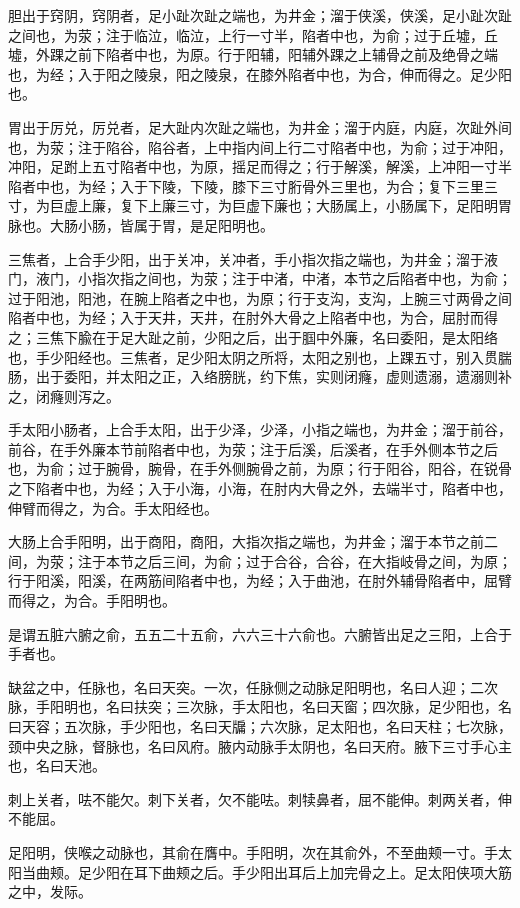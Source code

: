 \documentclass[a4paper,12pt,UTF8,twoside]{ctexbook}
\begin{document}
	胆出于窍阴，窍阴者，足小趾次趾之端也，为井金；溜于侠溪，侠溪，足小趾次趾之间也，为荥；注于临泣，临泣，上行一寸半，陷者中也，为俞；过于丘墟，丘墟，外踝之前下陷者中也，为原。行于阳辅，阳辅外踝之上辅骨之前及绝骨之端也，为经；入于阳之陵泉，阳之陵泉，在膝外陷者中也，为合，伸而得之。足少阳也。
	
	胃出于厉兑，厉兑者，足大趾内次趾之端也，为井金；溜于内庭，内庭，次趾外间也，为荥；注于陷谷，陷谷者，上中指内间上行二寸陷者中也，为俞；过于冲阳，冲阳，足跗上五寸陷者中也，为原，摇足而得之；行于解溪，解溪，上冲阳一寸半陷者中也，为经；入于下陵，下陵，膝下三寸胻骨外三里也，为合；复下三里三寸，为巨虚上廉，复下上廉三寸，为巨虚下廉也；大肠属上，小肠属下，足阳明胃脉也。大肠小肠，皆属于胃，是足阳明也。
	
	三焦者，上合手少阳，出于关冲，关冲者，手小指次指之端也，为井金；溜于液门，液门，小指次指之间也，为荥；注于中渚，中渚，本节之后陷者中也，为俞；过于阳池，阳池，在腕上陷者之中也，为原；行于支沟，支沟，上腕三寸两骨之间陷者中也，为经；入于天井，天井，在肘外大骨之上陷者中也，为合，屈肘而得之；三焦下腧在于足大趾之前，少阳之后，出于腘中外廉，名曰委阳，是太阳络也，手少阳经也。三焦者，足少阳太阴之所将，太阳之别也，上踝五寸，别入贯腨肠，出于委阳，并太阳之正，入络膀胱，约下焦，实则闭癃，虚则遗溺，遗溺则补之，闭癃则泻之。
	
	手太阳小肠者，上合手太阳，出于少泽，少泽，小指之端也，为井金；溜于前谷，前谷，在手外廉本节前陷者中也，为荥；注于后溪，后溪者，在手外侧本节之后也，为俞；过于腕骨，腕骨，在手外侧腕骨之前，为原；行于阳谷，阳谷，在锐骨之下陷者中也，为经；入于小海，小海，在肘内大骨之外，去端半寸，陷者中也，伸臂而得之，为合。手太阳经也。
	
	大肠上合手阳明，出于商阳，商阳，大指次指之端也，为井金；溜于本节之前二间，为荥；注于本节之后三间，为俞；过于合谷，合谷，在大指岐骨之间，为原；行于阳溪，阳溪，在两筋间陷者中也，为经；入于曲池，在肘外辅骨陷者中，屈臂而得之，为合。手阳明也。
	
	是谓五脏六腑之俞，五五二十五俞，六六三十六俞也。六腑皆出足之三阳，上合于手者也。
	
	缺盆之中，任脉也，名曰天突。一次，任脉侧之动脉足阳明也，名曰人迎；二次脉，手阳明也，名曰扶突；三次脉，手太阳也，名曰天窗；四次脉，足少阳也，名曰天容；五次脉，手少阳也，名曰天牖；六次脉，足太阳也，名曰天柱；七次脉，颈中央之脉，督脉也，名曰风府。腋内动脉手太阴也，名曰天府。腋下三寸手心主也，名曰天池。
	
	刺上关者，呿不能欠。刺下关者，欠不能呿。刺犊鼻者，屈不能伸。刺两关者，伸不能屈。
	
	足阳明，侠喉之动脉也，其俞在膺中。手阳明，次在其俞外，不至曲颊一寸。手太阳当曲颊。足少阳在耳下曲颊之后。手少阳出耳后上加完骨之上。足太阳侠项大筋之中，发际。
	
\end{document}
